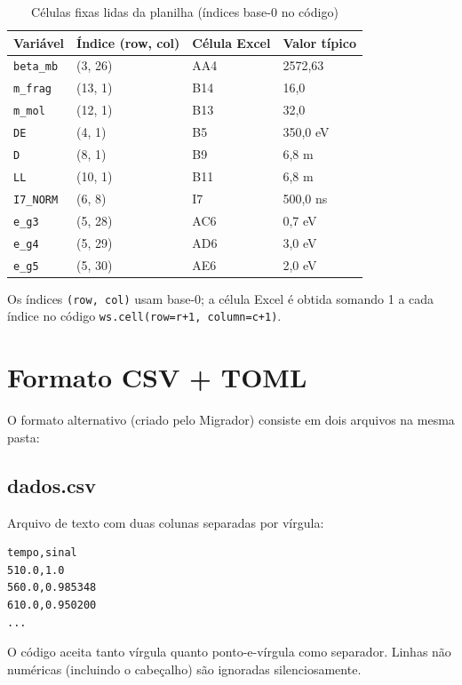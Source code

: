 \documentclass[12pt,a4paper]{report}
\newcommand{\code}[1]{\texttt{#1}}
\begin{document}
\begin{table}[h!]
  \centering
  \caption{Células fixas lidas da planilha (índices base-0 no código)}
  \begin{tabular}{llll}
    \toprule
    \textbf{Variável} & \textbf{Índice (row, col)} & \textbf{Célula Excel} & \textbf{Valor típico} \\
    \midrule
    \code{beta\_mb} & (3, 26) & AA4  & 2572,63 \\
    \code{m\_frag}  & (13, 1) & B14  & 16,0 \\
    \code{m\_mol}   & (12, 1) & B13  & 32,0 \\
    \code{DE}       & (4, 1)  & B5   & 350,0 eV \\
    \code{D}        & (8, 1)  & B9   & 6,8 m \\
    \code{LL}       & (10, 1) & B11  & 6,8 m \\
    \code{I7\_NORM} & (6, 8)  & I7   & 500,0 ns \\
    \code{e\_g3}    & (5, 28) & AC6  & 0,7 eV \\
    \code{e\_g4}    & (5, 29) & AD6  & 3,0 eV \\
    \code{e\_g5}    & (5, 30) & AE6  & 2,0 eV \\
    \bottomrule
  \end{tabular}
\end{table}

Os índices \texttt{(row, col)} usam base-0; a célula Excel é obtida somando
1 a cada índice no código \code{ws.cell(row=r+1, column=c+1)}.

\section{Formato CSV + TOML}

O formato alternativo (criado pelo Migrador) consiste em dois arquivos
na mesma pasta:

\subsection{dados.csv}

Arquivo de texto com duas colunas separadas por vírgula:
\begin{verbatim}
tempo,sinal
510.0,1.0
560.0,0.985348
610.0,0.950200
...
\end{verbatim}

O código aceita tanto vírgula quanto ponto-e-vírgula como separador.
Linhas não numéricas (incluindo o cabeçalho) são ignoradas silenciosamente.
\end{document}
